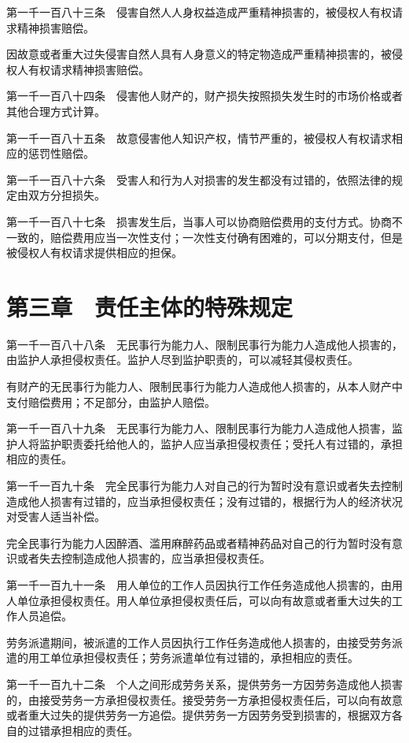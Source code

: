 \documentclass[UTF8,12pt,a4paper]{ctexbook}
\begin{document}
第一千一百八十三条　侵害自然人人身权益造成严重精神损害的，被侵权人有权请求精神损害赔偿。

因故意或者重大过失侵害自然人具有人身意义的特定物造成严重精神损害的，被侵权人有权请求精神损害赔偿。

第一千一百八十四条　侵害他人财产的，财产损失按照损失发生时的市场价格或者其他合理方式计算。

第一千一百八十五条　故意侵害他人知识产权，情节严重的，被侵权人有权请求相应的惩罚性赔偿。

第一千一百八十六条　受害人和行为人对损害的发生都没有过错的，依照法律的规定由双方分担损失。

第一千一百八十七条　损害发生后，当事人可以协商赔偿费用的支付方式。协商不一致的，赔偿费用应当一次性支付；一次性支付确有困难的，可以分期支付，但是被侵权人有权请求提供相应的担保。

\section*{第三章　责任主体的特殊规定}

第一千一百八十八条　无民事行为能力人、限制民事行为能力人造成他人损害的，由监护人承担侵权责任。监护人尽到监护职责的，可以减轻其侵权责任。

有财产的无民事行为能力人、限制民事行为能力人造成他人损害的，从本人财产中支付赔偿费用；不足部分，由监护人赔偿。

第一千一百八十九条　无民事行为能力人、限制民事行为能力人造成他人损害，监护人将监护职责委托给他人的，监护人应当承担侵权责任；受托人有过错的，承担相应的责任。

第一千一百九十条　完全民事行为能力人对自己的行为暂时没有意识或者失去控制造成他人损害有过错的，应当承担侵权责任；没有过错的，根据行为人的经济状况对受害人适当补偿。

完全民事行为能力人因醉酒、滥用麻醉药品或者精神药品对自己的行为暂时没有意识或者失去控制造成他人损害的，应当承担侵权责任。

第一千一百九十一条　用人单位的工作人员因执行工作任务造成他人损害的，由用人单位承担侵权责任。用人单位承担侵权责任后，可以向有故意或者重大过失的工作人员追偿。

劳务派遣期间，被派遣的工作人员因执行工作任务造成他人损害的，由接受劳务派遣的用工单位承担侵权责任；劳务派遣单位有过错的，承担相应的责任。

第一千一百九十二条　个人之间形成劳务关系，提供劳务一方因劳务造成他人损害的，由接受劳务一方承担侵权责任。接受劳务一方承担侵权责任后，可以向有故意或者重大过失的提供劳务一方追偿。提供劳务一方因劳务受到损害的，根据双方各自的过错承担相应的责任。
\end{document}
